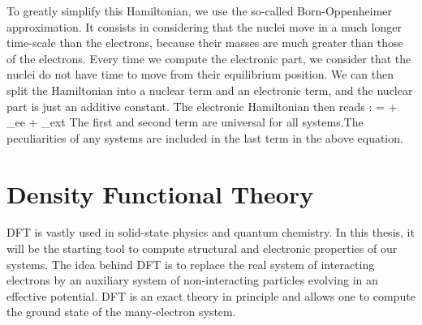 To greatly simplify this Hamiltonian, we use the so-called Born-Oppenheimer approximation. It consists in considering that the nuclei move in a much longer time-scale than the electrons, because their masses are much greater than those of the electrons. Every time we compute the electronic part, we consider that the nuclei do not have time to move from their equilibrium position. \cite{martin2020electronic} We can then split the Hamiltonian into a nuclear term and an electronic term, and the nuclear part is just an additive constant. The electronic Hamiltonian then reads :
\be
	 =  + _{ee} + _{ext}
\ee
The first and second term are universal for all systems.The peculiarities of any systems are included in the last term in the above equation.

\section{Density Functional Theory}
\acrfull{DFT} is vastly used in solid-state physics and quantum chemistry. In this thesis, it will be the starting tool to compute structural and electronic properties of our systems. The idea behind \acrshort{DFT} is to replace the real system of interacting electrons by an auxiliary system of non-interacting particles evolving in an effective potential. \acrshort{DFT} is an exact theory in principle and allows one to compute the ground state of the many-electron system.

